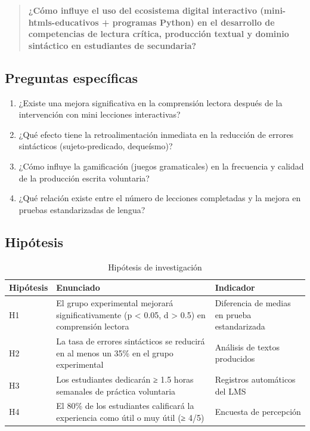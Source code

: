 \documentclass[12pt,spanish]{article}
\begin{document}
\begin{quote}
\textbf{¿Cómo influye el uso del ecosistema digital interactivo (mini-htmls-educativos + programas Python) en el desarrollo de competencias de lectura crítica, producción textual y dominio sintáctico en estudiantes de secundaria?}
\end{quote}

\subsection{Preguntas específicas}

\begin{enumerate}
    \item ¿Existe una mejora significativa en la comprensión lectora después de la intervención con mini lecciones interactivas?
    \item ¿Qué efecto tiene la retroalimentación inmediata en la reducción de errores sintácticos (sujeto-predicado, dequeísmo)?
    \item ¿Cómo influye la gamificación (juegos gramaticales) en la frecuencia y calidad de la producción escrita voluntaria?
    \item ¿Qué relación existe entre el número de lecciones completadas y la mejora en pruebas estandarizadas de lengua?
\end{enumerate}

\subsection{Hipótesis}

\begin{table}[H]
\centering
\caption{Hipótesis de investigación}
\label{tab:hipotesis}
\begin{tabular}{|p{3cm}|p{7cm}|p{4cm}|}
\hline
\textbf{Hipótesis} & \textbf{Enunciado} & \textbf{Indicador} \\
\hline
H1 & El grupo experimental mejorará significativamente (p < 0.05, d > 0.5) en comprensión lectora & Diferencia de medias en prueba estandarizada \\
\hline
H2 & La tasa de errores sintácticos se reducirá en al menos un 35\% en el grupo experimental & Análisis de textos producidos \\
\hline
H3 & Los estudiantes dedicarán ≥ 1.5 horas semanales de práctica voluntaria & Registros automáticos del LMS \\
\hline
H4 & El 80\% de los estudiantes calificará la experiencia como útil o muy útil (≥ 4/5) & Encuesta de percepción \\
\hline
\end{tabular}
\end{table}
\end{document}
